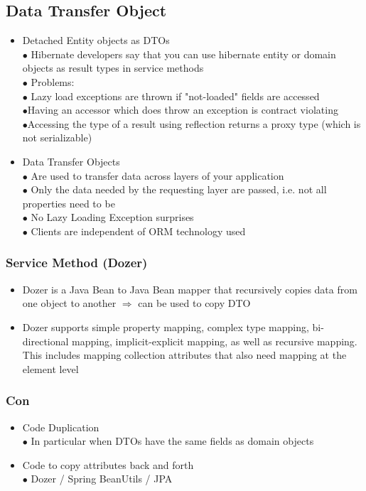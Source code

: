 \documentclass[10pt]{scrartcl}
\newcommand{\Ra}{\Rightarrow}
\begin{document}
\subsection{Data Transfer Object}
\begin{itemize}
\item Detached Entity objects as DTOs\\
$\bullet$ Hibernate developers say that you can use hibernate entity or domain objects as result types in service methods\\
$\bullet$ Problems:\\
\hspace*{0.5cm}$\bullet$ Lazy load exceptions are thrown if "not-loaded" fields are accessed\\
\hspace*{0.5cm}$\bullet$Having an accessor which does throw an exception is contract violating\\
\hspace*{0.5cm}$\bullet$Accessing the type of a result using reflection returns a proxy type (which is not serializable)
\item Data Transfer Objects\\
$\bullet$ Are used to transfer data across layers of your application\\
$\bullet$ Only the data needed by the requesting layer are passed, i.e. not all properties need to be\\
$\bullet$ No Lazy Loading Exception surprises\\
$\bullet$ Clients are independent of ORM technology used
\end{itemize}
\subsubsection{Service Method (Dozer)}
\begin{itemize}
\item Dozer is a Java Bean to Java Bean mapper that recursively copies data from one object to another $\Ra$ can be used to copy DTO
\item Dozer supports simple property mapping, complex type mapping, bi-directional mapping, implicit-explicit mapping, as well as recursive mapping. This includes mapping collection attributes that also need mapping at the element level
\end{itemize}
\subsubsection{Con}
\begin{itemize}
\item Code Duplication\\
$\bullet$ In particular when DTOs have the same fields as domain objects
\item Code to copy attributes back and forth\\
$\bullet$ Dozer / Spring BeanUtils / JPA
\end{itemize}
\end{document}

